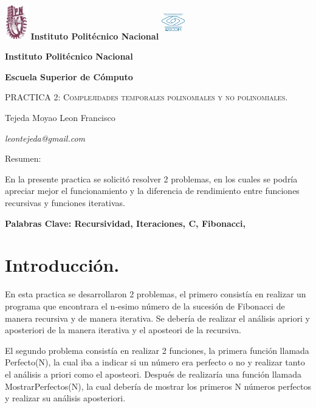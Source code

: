 \documentclass{report}
\begin{document}
	\begin{titlepage}
		
		\begin{center}
			\includegraphics[width=1cm, height=1.5cm]{ipn}
			\bfseries\LARGE Instituto Politécnico Nacional
			\includegraphics[width=1cm, height=1.5cm]{escom}\par
			\bfseries\LARGE Instituto Politécnico Nacional \par
			\bfseries\LARGE Escuela Superior de Cómputo \par
			\vspace{3cm}
			\scshape\large PRACTICA 2: Complejidades temporales polinomiales y no polinomiales. \par
			\vspace{1cm}
			\large Tejeda Moyao Leon Francisco \par
			\itshape\large leontejeda@gmail.com \par
			\vspace{1cm}
		\end{center}
		
		
		\begin{bf}
			\large Resumen:
		\end{bf}
	
		\large En la presente practica se solicitó resolver 2 problemas, en los cuales se podría apreciar mejor el funcionamiento y la diferencia de rendimiento entre funciones recursivas y funciones iterativas.\par
			
		\bf\large Palabras Clave: Recursividad, Iteraciones, C, Fibonacci, \par
	\end{titlepage}
	\newpage
	
	\section*{Introducción.}
	\large  En esta practica se desarrollaron 2 problemas, el primero consistía en realizar un programa que encontrara el n-esimo número de la sucesión de Fibonacci de manera recursiva y de manera iterativa. Se debería de realizar el análisis apriori y aposteriori de la manera iterativa y el aposteori de la recursiva.\par
	\large  El segundo problema consistía en realizar 2 funciones, la primera función llamada Perfecto(N), la cual iba a indicar si un número era perfecto o no y realizar tanto el análisis a priori como el aposteori. Después de realizaría una función llamada MostrarPerfectos(N), la cual debería de mostrar los primeros N números perfectos y realizar su análisis aposteriori.\par
		
\end{document}
